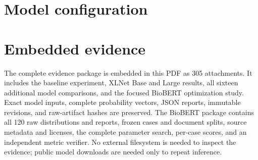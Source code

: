 \documentclass[11pt,a4paper]{article}
\begin{document}
\section{Model configuration}


\section{Embedded evidence}
The complete evidence package is embedded in this PDF as 305 attachments. It includes the baseline experiment, XLNet Base and Large results, all sixteen additional model comparisons, and the focused BioBERT optimization study. Exact model inputs, complete probability vectors, JSON reports, immutable revisions, and raw-artifact hashes are preserved. The BioBERT package contains all 120 raw distributions and reports, frozen cases and document splits, source metadata and licenses, the complete parameter search, per-case scores, and an independent metric verifier. No external filesystem is needed to inspect the evidence; public model downloads are needed only to repeat inference.
\end{document}
